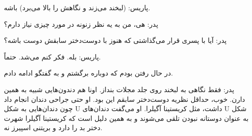 پاریس: (لبخند می‌زند و نگاهش را بالا می‌برد) باشه.

پدر: هی، من به یه نظر زنونه در مورد چیزی نیاز دارم؟

پدر: آیا با پسری قرار می‌گذاشتی که هنوز با دوست‌دختر سابقش دوست باشه؟

پاریس: بله. فکر کنم می‌شد. حتماً.

در حال رفتن بودم که دوباره برگشتم و به گفتگو ادامه دادم.

پدر: فقط نگاهی به لبخند روی جلد مجلات بنداز. اونا هم دندون‌هایی شبیه به همین دارن. خوب، حداقل نظریه دوست‌دختر سابقم این بود. او حتی جراحی دندان انجام داد چون دندان‌هایی به شکل U داشت، مثل کریستینا آگیلرا. او می‌گفت دندان‌های U شکل به عنوان دوستانه نبودن تلقی می‌شوند و به همین دلیل است که کریستینا آگیلرا شهرت دختر بد را دارد و بریتنی اسپیرز نه.